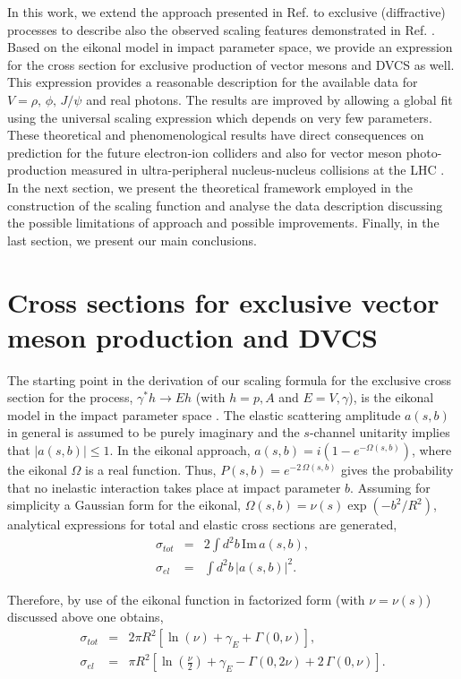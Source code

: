 \documentclass[twocolumn,showpacs,preprintnumbers,amsmath,amssymb,showkeys,aps,prd,a4paper,byrevtex]{revtex4}
\begin{document}
In this work, we extend the approach presented in Ref. \cite{Armesto_scal}  to exclusive (diffractive) processes to describe also the observed scaling features demonstrated in Ref. \cite{MS}. Based on the eikonal model in impact parameter space, we provide an expression for the cross section for exclusive production of vector mesons and DVCS as well. This expression provides a reasonable description for the available data for $V=\rho,\,\phi,\, J/\psi$ and real photons. The results are improved  by allowing a global fit using the universal scaling expression which depends on very few parameters. These theoretical and phenomenological results have direct consequences on prediction for the future electron-ion colliders \cite{EICs} and also for vector meson photo-production measured in ultra-peripheral nucleus-nucleus collisions at the LHC \cite{Glauber1,Glauber2}. In the next section, we present the theoretical framework employed in the construction of the scaling function and analyse the data description discussing the possible limitations of approach and possible improvements. Finally, in the last section,  we present our main conclusions.


\section{Cross sections for exclusive vector meson production and DVCS \label{sec:sigma}}

The starting point in the derivation of our scaling formula for the exclusive cross section for the process, $\gamma^*h\rightarrow Eh$ (with $h=p,A$ and $E=V,\gamma$), is the eikonal model in the impact parameter space \cite{BC}. The elastic scattering amplitude $a(s,b)$ in general is assumed to be purely imaginary and the $s$-channel unitarity implies that $|a(s,b)|\leq 1$. In the eikonal approach, $a(s,b) = i(1-e^{-\Omega(s,b)})$, where the eikonal $\Omega$ is a real function. Thus, $P(s,b)=e^{-2\,\Omega(s,b)}$ gives the probability that no inelastic interaction takes place at impact parameter $b$. Assuming for simplicity a Gaussian form for the eikonal, $\Omega(s,b) = \nu(s)\exp\left( -b^2/R^2 \right)$, analytical expressions for total and elastic cross sections are generated,
\begin{eqnarray}
\sigma_{tot} & = & 2\int d^2b \,\mathrm{Im}\, a(s,b),\\
\sigma_{el} & = & \int d^2b \,|a(s,b)|^2.
\end{eqnarray}

Therefore, by use of the eikonal function in factorized form (with $\nu=\nu(s)$) discussed above one obtains,
\begin{eqnarray}
\label{sigtot}
\sigma_{tot} & = & 2\pi R^2\left[\ln(\nu) +\gamma_E+\Gamma\left(0,\nu \right) \right],\\
\sigma_{el} & = & \pi R^2\left[\ln \left(\frac{\nu}{2}\right) +\gamma_E-\Gamma\left(0,2\nu \right) + 2\,\Gamma\left(0,\nu \right)  \right].\label{sigel}
\end{eqnarray}
\end{document}
